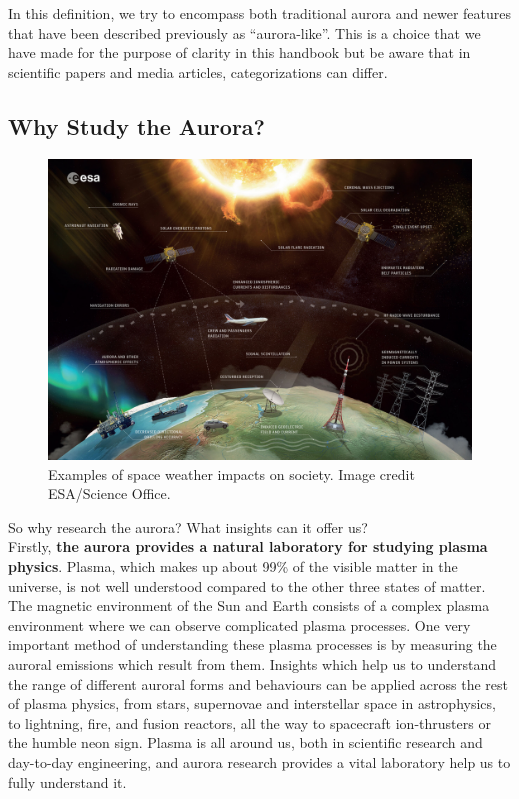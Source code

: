 \documentclass{article}
\newcommand{\contributed}[1]{%
    \par\noindent
    \begingroup
    \setlength{\leftskip}{1em}%
    \itshape
    Contributors: #1
    \par
    \endgroup
    \vspace{0.5em}
}
\begin{document}
In this definition, we try to encompass both traditional aurora and newer features that have been described previously as ``aurora-like''. This is a choice that we have made for the purpose of clarity in this handbook but be aware that in scientific papers and media articles, categorizations can differ.





\subsection{Why Study the Aurora?}

\begin{figure}[h!]
  \includegraphics[width=\linewidth]{Fig2_SpaceWeather.jpg}
  \caption{Examples of space weather impacts on society. Image credit ESA/Science Office.}
  \label{space weather}
  
\end{figure}

So why research the aurora? What insights can it offer us?\\

Firstly, \textbf{the aurora provides a natural laboratory for studying plasma physics}. Plasma, which makes up about 99\% of the visible matter in the universe, is not well understood compared to the other three states of matter. The magnetic environment of the Sun and Earth consists of a complex plasma environment where we can observe complicated plasma processes. One very important method of understanding these plasma processes is by measuring the auroral emissions which result from them. Insights which help us to understand the range of different auroral forms and behaviours can be applied across the rest of plasma physics, from stars, supernovae and interstellar space in astrophysics, to lightning, fire, and fusion reactors, all the way to spacecraft ion-thrusters or the humble neon sign. Plasma is all around us, both in scientific research and day-to-day engineering, and aurora research provides a vital laboratory help us to fully understand it.
\end{document}

